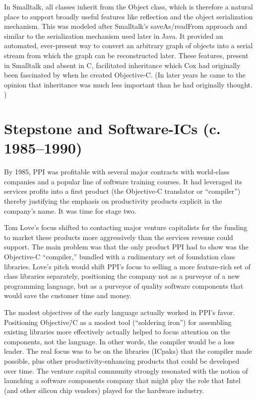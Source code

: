 \documentclass[acmsmall,screen]{acmart}
\begin{document}
In Smalltalk, all classes inherit from the Object class, which is therefore a natural place to support broadly useful features like reflection and the object serialization mechanism. This was modeled after Smalltalk's saveAs/readFrom approach and similar to the serialization mechanism used later in Java. It provided an automated, ever-present way to convert an arbitrary graph of objects into a serial stream from which the graph can be reconstructed later. These features, present in Smalltalk and absent in C, facilitated inheritance which Cox had originally been fascinated by when he created Objective-C. (In later years he came to the opinion that inheritance was much less important than he had originally thought. \citetext{\citealp[259]{biancuzzi_objective-c_2009}; \citealp[50--51]{cox_oral_2016}})
\section{Stepstone and Software-ICs (c. 1985--1990)}
\label{sec-stepstone_swIC}
By 1985, PPI was profitable with several major contracts with world-class companies and a popular line of software training courses. It had leveraged its services profits into a first product (the Objective-C translator or ``compiler'') thereby justifying the emphasis on productivity products explicit in the company's name. It was time for stage two.

Tom Love's focus shifted to contacting major venture capitalists for the funding to market these products more aggressively than the services revenue could support. The main problem was that the only product PPI had to show was the Objective-C ``compiler,'' bundled with a rudimentary set of foundation class libraries. Love's pitch would shift PPI's focus to selling a more feature-rich set of class libraries separately, positioning the company not as a purveyor of a new programming language, but as a purveyor of quality software components that would save the customer time and money.

The modest objectives of the early language actually worked in PPI's favor. Positioning Objective\=/C as a modest tool (``soldering iron'') for assembling existing libraries more effectively actually helped to focus attention on the components, not the language. In other words, the compiler would be a loss leader. The real focus was to be on the libraries (ICpaks) that the compiler made possible, plus other productivity-enhancing products that could be developed over time. The venture capital community strongly resonated with the notion of launching a software components company that might play the role that Intel (and other silicon chip vendors) played for the hardware industry. 
\end{document}

